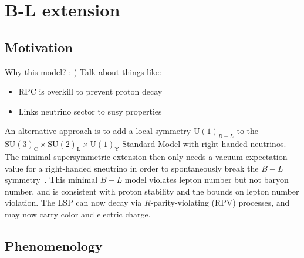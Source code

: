 \section{B-L extension}
\label{sec:theory_bl_extension}


\FloatBarrier
\subsection{Motivation}

{\color{red} Why this model? :-) Talk about things like:
\begin{itemize}
\item RPC is overkill to prevent proton decay
\item Links neutrino sector to susy properties
\end{itemize}
}

An alternative approach is to add a local symmetry $\mathrm{U}(1)_{B-L}$ to the
$\mathrm{SU}(3)_\mathrm{C} \times
\mathrm{SU}(2)_\mathrm{L} \times
\mathrm{U}(1)_\mathrm{Y}$ Standard Model with right-handed neutrinos.
The minimal supersymmetric extension then only needs a vacuum expectation value
for a right-handed sneutrino in order to spontaneously break the
$B-L$ symmetry~\cite{FileviezPerez:2008sx, Barger:2008wn, FileviezPerez:2009gr,
Everett:2009vy, Evans:1986ada, Lukas:1998yy, Braun:2005ux, Braun:2005nv,
Braun:2006ae, Ambroso:2009jd, Ambroso:2010pe, Ovrut:2012wg}.
This minimal $B-L$ model violates lepton number but not baryon number, and is
consistent with proton stability and the bounds on lepton number violation.
The LSP can now decay via $R$-parity-violating (RPV) processes, and may now
carry color and electric charge.

\FloatBarrier
\subsection{Phenomenology}

